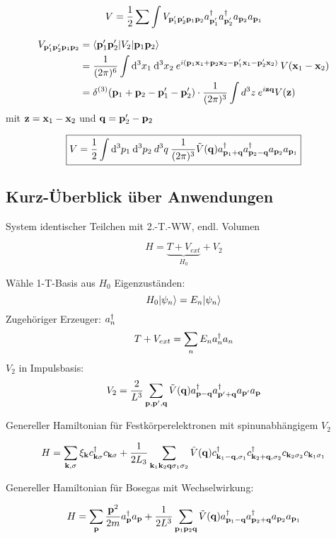 \documentclass[11pt,a4paper]{report}
\begin{document}
$$V = \frac{1}{2}\sum\int V_{\mathbf{p}_1'\mathbf{p}_2'\mathbf{p}_1\mathbf{p}_2}a_{\mathbf{p}_1'}^\dagger a_{\mathbf{p}_2'}^\dagger a_{\mathbf{p}_2}a_{\mathbf{p}_1}$$

\begin{align*}
V_{\mathbf{p}_1'\mathbf{p}_2'\mathbf{p}_1\mathbf{p}_2} &= \langle \mathbf{p}_1'\mathbf{p}_2'|V_2|\mathbf{p}_1\mathbf{p}_2\rangle \\
&=\frac{1}{(2\pi )^6}\int\mathrm{d}^3x_1\:\mathrm{d}^3x_2\: e^{i(\mathbf{p}_1\mathbf{x}_1 + \mathbf{p}_2\mathbf{x}_2 - \mathbf{p}_1'\mathbf{x}_1 - \mathbf{p}_2'\mathbf{x}_2)}\: V(\mathbf{x}_1-\mathbf{x}_2) \\
&= \delta^{(3)}(\mathbf{p}_1+\mathbf{p}_2 - \mathbf{p}_1' -\mathbf{p}_2')\cdot \frac{1}{(2\pi )^3}\int d^3z\:e^{i\mathbf{z}\mathbf{q}}V(\mathbf{z})
\end{align*}
mit $\mathbf{z}=\mathbf{x}_1-\mathbf{x}_2$ und $\mathbf{q}=\mathbf{p}_2'-\mathbf{p}_2$

$$\boxed{V = \frac{1}{2}\int \mathrm{d}^3p_1\:\mathrm{d}^3p_2\:d^3q\:\frac{1}{(2\pi )^3}\tilde{V}(\mathbf{q})a_{\mathbf{p}_1+\mathbf{q}}^\dagger a_{\mathbf{p}_2-\mathbf{q}}^\dagger a_{\mathbf{p}_2}a_{\mathbf{p}_1}}$$

\subsection{Kurz-Überblick über Anwendungen}

System identischer Teilchen mit 2.-T.-WW, endl. Volumen

$$H=\underbrace{T+V_{ext}}_{H_0}+V_2$$

Wähle 1-T-Basis aus $H_0$ Eigenzuständen:
$$H_0|\psi_n\rangle=E_n|\psi_n\rangle$$
Zugehöriger Erzeuger: $a_{n}^\dagger$
$$T+V_{ext}=\sum_n E_na_{n}^\dagger a_{n}$$
$V_2$ in Impulsbasis:
$$V_2 = \frac{2}{L^3}\sum_{\mathbf{p},\mathbf{p}',\mathbf{q}}\tilde{V}(\mathbf{q})a_{\mathbf{p}-\mathbf{q}}^\dagger a_{\mathbf{p}'+\mathbf{q}}^\dagger a_{\mathbf{p}'}a_{\mathbf{p}}$$

Genereller Hamiltonian für Festkörperelektronen mit spinunabhängigem $V_2$

$$H = \sum_{\mathbf{k},\sigma}\xi_{\mathbf{k}}c^\dagger_{\mathbf{k}\sigma}c_{\mathbf{k}\sigma} + \frac{1}{2L_3}\sum_{\mathbf{k}_1\mathbf{k}_2\mathbf{q}\sigma_1\sigma_2}\tilde{V}(\mathbf{q})c^\dagger_{\mathbf{k}_1-\mathbf{q},\sigma_1}c^\dagger_{\mathbf{k}_2+\mathbf{q},\sigma_2}c_{\mathbf{k}_2\sigma_2}c_{\mathbf{k}_1\sigma_1}$$

Genereller Hamiltonian für Bosegas mit Wechselwirkung:

$$H=\sum_{\mathbf{p}}\frac{\mathbf{p}^2}{2m}a_{\mathbf{p}}^\dagger a_{\mathbf{p}}+\frac{1}{2L^3}\sum_{\mathbf{p}_1\mathbf{p}_2\mathbf{q}}\tilde{V}(\mathbf{q})a_{\mathbf{p}_1-\mathbf{q}}^\dagger a_{\mathbf{p}_2+\mathbf{q}}^\dagger a_{\mathbf{p}_2}a_{\mathbf{p}_1}$$
\end{document}
